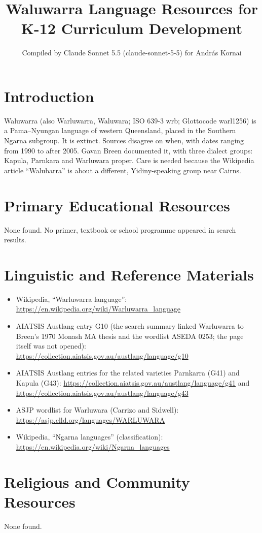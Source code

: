 \documentclass[12pt]{article}
\title{Waluwarra Language Resources for K-12 Curriculum Development}
\author{Compiled by Claude Sonnet 5.5 (claude-sonnet-5-5) for Andr\'as Kornai}
\date{}
\begin{document}
\maketitle

\section{Introduction}
Waluwarra (also Warluwarra, Waluwara; ISO 639-3 wrb; Glottocode warl1256) is a Pama--Nyungan language of western Queensland, placed in the Southern Ngarna subgroup. It is extinct. Sources disagree on when, with dates ranging from 1990 to after 2005. Gavan Breen documented it, with three dialect groups: Kapula, Parnkara and Warluwara proper. Care is needed because the Wikipedia article ``Walubarra'' is about a different, Yidiny-speaking group near Cairns.

\section{Primary Educational Resources}
None found. No primer, textbook or school programme appeared in search results.

\section{Linguistic and Reference Materials}
\begin{itemize}
\item Wikipedia, ``Warluwarra language'': \url{https://en.wikipedia.org/wiki/Warluwarra_language}
\item AIATSIS Austlang entry G10 (the search summary linked Warluwarra to Breen's 1970 Monash MA thesis and the wordlist ASEDA 0253; the page itself was not opened): \url{https://collection.aiatsis.gov.au/austlang/language/g10}
\item AIATSIS Austlang entries for the related varieties Parnkarra (G41) and Kapula (G43): \url{https://collection.aiatsis.gov.au/austlang/language/g41} and \url{https://collection.aiatsis.gov.au/austlang/language/g43}
\item ASJP wordlist for Warluwara (Carrizo and Sidwell): \url{https://asjp.clld.org/languages/WARLUWARA}
\item Wikipedia, ``Ngarna languages'' (classification): \url{https://en.wikipedia.org/wiki/Ngarna_languages}
\end{itemize}

\section{Religious and Community Resources}
None found.
\end{document}
